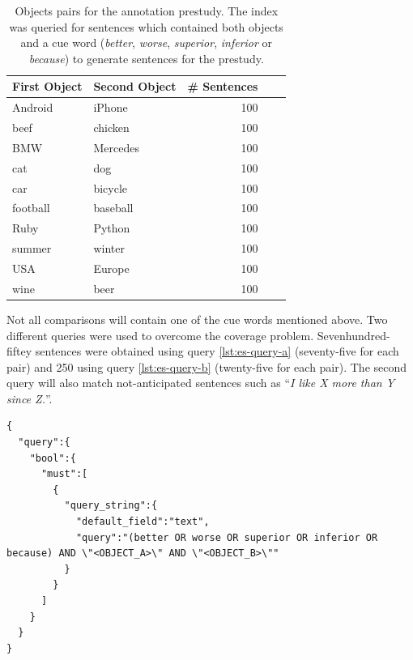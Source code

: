\begin{table}[h]
\centering
\caption{Objects pairs for the annotation prestudy. The index was queried for sentences which contained both objects and a cue word (\emph{better}, \emph{worse}, \emph{superior}, \emph{inferior} or \emph{because}) to generate sentences for the prestudy.}
\label{tbl:prestudy-objects}
\begin{tabular}{@{}llrrr@{}}
\toprule
First Object & Second Object      & \# Sentences                             \\ \midrule
Android & iPhone    &   100  \\
beef & chicken & 100   \\
BMW    & Mercedes    & 100  \\
cat & dog      &     100  \\ 
car & bicycle & 100 \\
football & baseball   &  100 \\ 
Ruby    & Python    & 100      \\
summer & winter &  100\\
USA & Europe & 100 \\
wine & beer  & 100  \\
\bottomrule  
                               
\end{tabular}
\end{table}

Not all comparisons will contain one of the cue words mentioned above. Two different queries were used to overcome the coverage problem. Sevenhundred-fiftey sentences were obtained using query \ref{lst:es-query-a} (seventy-five for each pair) and 250 using query \ref{lst:es-query-b} (twenty-five for each pair). The second query will also match not-anticipated sentences such as \enquote{\emph{I like X more than Y since Z.}}.



\begin{lstlisting}[label=lst:es-query-a,breaklines=true,postbreak=\mbox{\textcolor{red}{$\hookrightarrow$}\space},caption=First query used to extract the sentences for the prestudy from the ElasticSearch index. OBJECT\_A and OBJECT\_B are placeholders for the first and second object.]
{
  "query":{
    "bool":{
      "must":[
        {
          "query_string":{
            "default_field":"text",
            "query":"(better OR worse OR superior OR inferior OR because) AND \"<OBJECT_A>\" AND \"<OBJECT_B>\""
          }
        }
      ]
    }
  }
}
\end{lstlisting}

